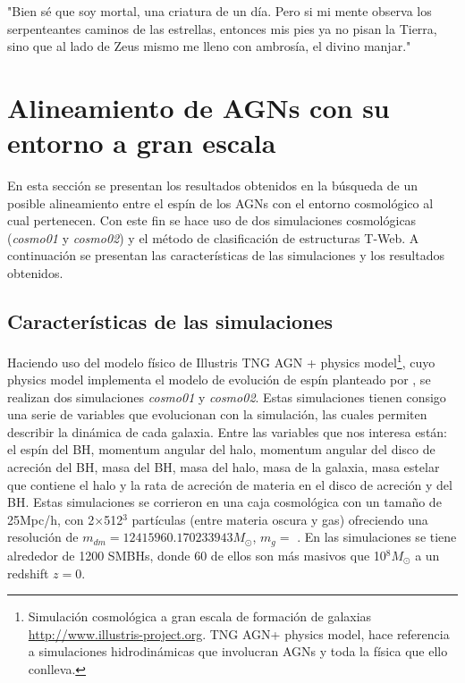 \begin{savequote}[60mm]
"Bien sé que soy mortal, una criatura de un día. Pero si mi mente observa los serpenteantes caminos de las estrellas, entonces mis pies ya no pisan la Tierra, sino que al lado de Zeus mismo me lleno con ambrosía, el divino manjar."
\end{savequote}




\chapter{Alineamiento de AGNs con su entorno a gran escala}
\label{cha:cosmic_web}

En esta sección se presentan los resultados obtenidos en la búsqueda de un posible alineamiento entre el espín de los AGNs con el entorno cosmológico al cual pertenecen. Con este fin  se hace uso de dos simulaciones cosmológicas ({\it{cosmo01}} y {\it{cosmo02}}) y el método  de clasificación de estructuras T-Web. A continuación se presentan las características de las simulaciones y  los resultados obtenidos.

\section{Características de las simulaciones}
\label{sec: propiedades en las simulaciones}

Haciendo uso del modelo físico de Illustris TNG AGN + physics model\footnote{Simulación cosmológica a gran escala de formación de galaxias \url{http://www.illustris-project.org}. TNG AGN+ physics model, hace referencia a simulaciones hidrodinámicas que involucran AGNs y toda la física que ello conlleva.}, cuyo physics model implementa el modelo de evolución de espín planteado por \cite{Bustamante2018b}, se realizan dos simulaciones {\it{cosmo01}} y {\it{cosmo02}}. Estas simulaciones tienen consigo una serie de variables que evolucionan con la simulación, las cuales permiten describir la dinámica de cada galaxia.
Entre las variables que nos interesa están: el espín del BH, momentum angular del halo, momentum angular del disco de acreción del BH, masa del BH, masa del halo, masa de la galaxia, masa estelar que contiene el halo y la rata de acreción de materia en el disco de acreción y del BH. Estas simulaciones se corrieron en una caja cosmológica con un tamaño de 25Mpc/h, con 2$\times$512$^{3}$ partículas (entre materia oscura y gas) %
ofreciendo una resolución de $m_{dm}= 12415960.170233943 M_{\odot}$, $m_{g} = $ 
. En las simulaciones se tiene alrededor de 1200 SMBHs, donde 60 de ellos son más masivos que 10$^{8}M_{\odot}$ a un redshift $z=0$.


